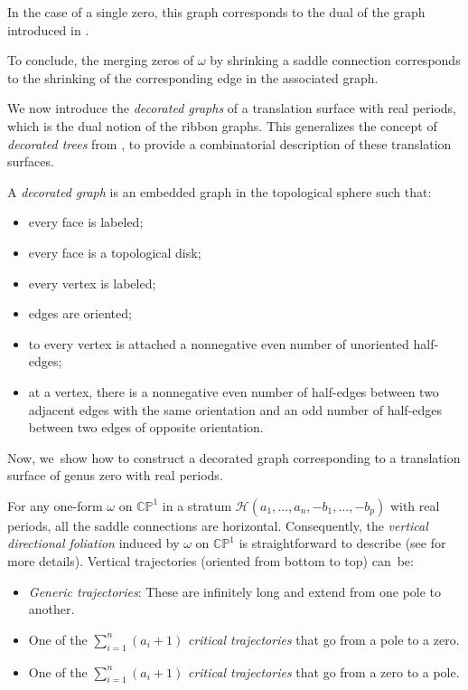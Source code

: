 In the case of a single zero, this graph corresponds to the dual of the graph introduced in \cite{GeTaIso}.

To conclude, the merging zeros of $\omega$ by shrinking a saddle connection corresponds to the shrinking of the corresponding edge in the associated graph.

We now introduce the \textit{decorated graphs} of a translation surface with real periods, which is the dual notion of the ribbon graphs. This generalizes the concept of \textit{decorated trees} from \cite{GeTaIso}, to provide a combinatorial description of these translation surfaces.

\begin{defn}\label{defn:abstractdecoratedtgraph}
A \textit{decorated graph} is an embedded graph in the topological sphere such that:
\begin{itemize}
\item every face is labeled;
\item every face is a topological disk;
\item every vertex is labeled;
\item edges are oriented;
\item to every vertex is attached a nonnegative even number of unoriented half-edges;
\item at a vertex, there is a nonnegative even number of half-edges between two adjacent edges with the same orientation and an odd number of half-edges between two edges of opposite orientation.
\end{itemize}
\end{defn}

Now, we~show how to construct a decorated graph corresponding to a translation surface of genus zero with real periods.

For any one-form $\omega$ on $\mathbb{CP}^{1}$ in a stratum $\mathcal{H}(a_{1},\dots,a_{n},-b_{1},\dots,-b_{p})$ with real periods, all the saddle connections are horizontal. Consequently, the \textit{vertical directional foliation} induced by $\omega$ on $\mathbb{CP}^{1}$ is straightforward to describe (see \cite[Prop.\,5.5]{tahar} for more details). Vertical trajectories (oriented from bottom to top) can~be:
\begin{itemize}
\item \textit{Generic trajectories}: These are infinitely long and extend from one pole to another.
\item One of the $\sum_{i=1}^n (a_{i}+1)$ \textit{critical trajectories} that go from a pole to a zero.
\item One of the $\sum_{i=1}^n (a_{i}+1)$ \textit{critical trajectories} that go from a zero to a pole.
\end{itemize}

